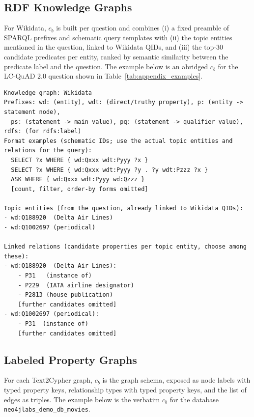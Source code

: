 \subsection{RDF Knowledge Graphs}
\label{sec:appendix_context_sparql}
For Wikidata, $c_b$ is built per question and combines (i) a fixed preamble of SPARQL prefixes and schematic query templates with (ii) the topic entities mentioned in the question, linked to Wikidata QIDs, and (iii) the top-30 candidate predicates per entity, ranked by semantic similarity between the predicate label and the question. The example below is an abridged $c_b$ for the LC-QuAD 2.0 question shown in Table~\ref{tab:appendix_examples}.

\begin{tcolorbox}[colback=gray!5, colframe=gray!50, boxrule=0.5pt, arc=2mm, left=4pt, right=4pt, top=3pt, bottom=3pt]
{\footnotesize
\begin{verbatim}
Knowledge graph: Wikidata
Prefixes: wd: (entity), wdt: (direct/truthy property), p: (entity -> statement node),
  ps: (statement -> main value), pq: (statement -> qualifier value), rdfs: (for rdfs:label)
Format examples (schematic IDs; use the actual topic entities and relations for the query):
  SELECT ?x WHERE { wd:Qxxx wdt:Pyyy ?x }
  SELECT ?x WHERE { wd:Qxxx wdt:Pyyy ?y . ?y wdt:Pzzz ?x }
  ASK WHERE { wd:Qxxx wdt:Pyyy wd:Qzzz }
  [count, filter, order-by forms omitted]

Topic entities (from the question, already linked to Wikidata QIDs):
- wd:Q188920  (Delta Air Lines)
- wd:Q1002697 (periodical)

Linked relations (candidate properties per topic entity, choose among these):
- wd:Q188920  (Delta Air Lines):
    - P31   (instance of)
    - P229  (IATA airline designator)
    - P2813 (house publication)
    [further candidates omitted]
- wd:Q1002697 (periodical):
    - P31  (instance of)
    [further candidates omitted]
\end{verbatim}
}
\end{tcolorbox}

\subsection{Labeled Property Graphs}
\label{sec:appendix_context_cypher}
For each Text2Cypher graph, $c_b$ is the graph schema, exposed as node labels with typed property keys, relationship types with typed property keys, and the list of edges as triples. The example below is the verbatim $c_b$ for the database \texttt{neo4jlabs\_demo\_db\_movies}.

